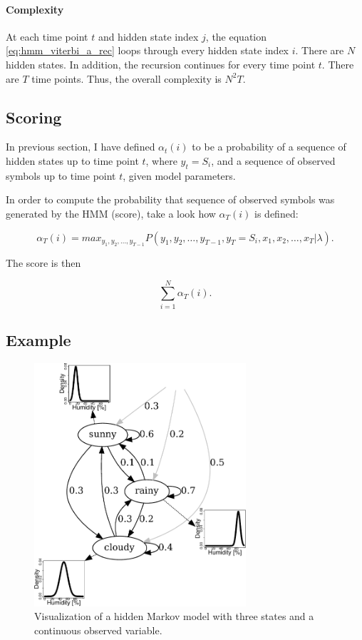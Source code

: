 \documentclass[thesis=B,english]{FITthesis}[2012/06/26]
\begin{document}
\paragraph{Complexity}

At each time point $t$ and hidden state index $j$, the equation \ref{eq:hmm_viterbi_a_rec} loops through every hidden state index $i$. There are $N$ hidden states. In addition, the recursion continues for every time point $t$. There are $T$ time points. Thus, the overall complexity is
$N^2 T$.

\subsection{Scoring}

In previous section, I have defined $\alpha_t(i)$ to be a probability of a sequence of hidden states up to time point $t$, where $y_t = S_i$, and a sequence of observed symbols up to time point $t$, given model parameters.

In order to compute the probability that sequence of observed symbols was generated by the HMM (score), take a look how $\alpha_T(i)$ is defined:

\begin{equation*}
\alpha_T(i) = max_{y_1,y_2,\dots,y_{T-1}} P(y_1,y_2,\dots,y_{T-1},y_T = S_i,x_1,x_2,\dots,x_T | \lambda).
\end{equation*}

The score is then

\begin{equation*}
\sum_{i=1}^{N} \alpha_T(i).
\end{equation*}

\subsection{Example}

\begin{figure}
	\centering
 	\includegraphics[width=0.7\textwidth]{hmm-graph}
 	\caption{Visualization of a hidden Markov model with three states and a continuous observed variable.}
 	\label{fig:hmm_graph}
\end{figure}
\end{document}
